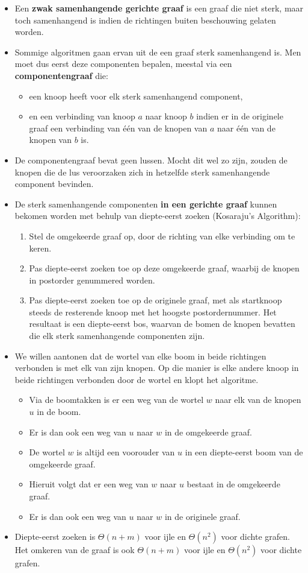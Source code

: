 \begin{itemize}
	\item Een \textbf{zwak samenhangende gerichte graaf} is een graaf die niet sterk, maar toch samenhangend is indien de richtingen buiten beschouwing gelaten worden. 
	\item Sommige algoritmen gaan ervan uit de een graaf sterk samenhangend is. Men moet dus eerst deze componenten bepalen, meestal via een \textbf{componentengraaf} die:
	\begin{itemize}
		\item een knoop heeft voor elk sterk samenhangend component,
		\item en een verbinding van knoop $a$ naar knoop $b$ indien er in de originele graaf een verbinding van één van de knopen van $a$ naar één van de knopen van $b$ is. 
	\end{itemize}
	\item De componentengraaf bevat geen lussen. Mocht dit wel zo zijn, zouden de knopen die de lus veroorzaken zich in hetzelfde sterk samenhangende component bevinden.
	\item De sterk samenhangende componenten \textbf{in een gerichte graaf} kunnen bekomen worden met behulp van diepte-eerst zoeken (Kosaraju's Algorithm):
	\begin{enumerate}
		\item Stel de omgekeerde graaf op, door de richting van elke verbinding om te keren.
		\item Pas diepte-eerst zoeken toe op deze omgekeerde graaf, waarbij de knopen in postorder genummered worden.
		\item Pas diepte-eerst zoeken toe op de originele graaf, met als startknoop steeds de resterende knoop met het hoogste postordernummer. Het resultaat is een diepte-eerst bos, waarvan de bomen de knopen bevatten die elk sterk samenhangende componenten zijn.
	\end{enumerate}
	\item We willen aantonen dat de wortel van elke boom in beide richtingen verbonden is met elk van zijn knopen.  Op die manier is elke andere knoop in beide richtingen verbonden door de wortel en klopt het algoritme.
	\begin{itemize}
		\item Via de boomtakken is er een weg van de wortel $w$ naar elk van de knopen $u$ in de boom. 
		\item Er is dan ook een weg van $u$ naar $w$ in de omgekeerde graaf.
		\item De wortel $w$ is altijd een voorouder van $u$ in een diepte-eerst boom van de omgekeerde graaf.
		\item Hieruit volgt dat er een weg van $w$ naar $u$ bestaat in de omgekeerde graaf.
		\item Er is dan ook een weg van $u$ naar $w$ in de originele graaf.
	\end{itemize}

	\item Diepte-eerst zoeken is $\Theta(n + m)$ voor ijle en $\Theta(n^2)$ voor dichte grafen. Het omkeren van de graaf is ook $\Theta(n + m)$ voor ijle en $\Theta(n^2)$ voor dichte grafen.
\end{itemize}




